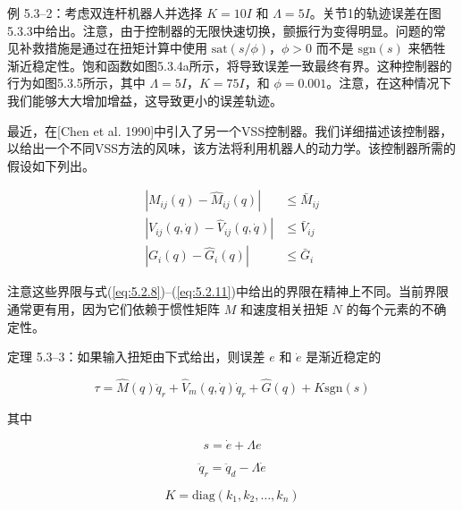 \documentclass[UTF8,12pt,a4paper]{ctexart}
\begin{document}
\begin{example}[VSS控制器 1]
例 5.3--2：考虑双连杆机器人并选择 $K = 10I$ 和 $\Lambda = 5I$。关节1的轨迹误差在图5.3.3中给出。注意，由于控制器的无限快速切换，颤振行为变得明显。问题的常见补救措施是通过在扭矩计算中使用 $\text{sat}(s/\phi)$，$\phi > 0$ 而不是 $\text{sgn}(s)$ 来牺牲渐近稳定性。饱和函数如图5.3.4a所示，将导致误差一致最终有界。这种控制器的行为如图5.3.5所示，其中 $\Lambda = 5I$，$K = 75I$，和 $\phi = 0.001$。注意，在这种情况下我们能够大大增加增益，这导致更小的误差轨迹。
\end{example}

最近，在[Chen et al. 1990]中引入了另一个VSS控制器。我们详细描述该控制器，以给出一个不同VSS方法的风味，该方法将利用机器人的动力学。该控制器所需的假设如下列出。

\begin{equation}\label{eq:5.3.7}
\begin{aligned}
|M_{ij}(q) - \hat{M}_{ij}(q)| &\leq \bar{M}_{ij} \\
|V_{ij}(q, \dot{q}) - \hat{V}_{ij}(q, \dot{q})| &\leq \bar{V}_{ij} \\
|G_i(q) - \hat{G}_i(q)| &\leq \bar{G}_i
\end{aligned}
\end{equation}

注意这些界限与式(\ref{eq:5.2.8})--(\ref{eq:5.2.11})中给出的界限在精神上不同。当前界限通常更有用，因为它们依赖于惯性矩阵 $M$ 和速度相关扭矩 $N$ 的每个元素的不确定性。

\begin{theorem}\label{thm:5.3.3}
定理 5.3--3：如果输入扭矩由下式给出，则误差 $e$ 和 $\dot{e}$ 是渐近稳定的

\begin{equation}
\tau = \hat{M}(q)\ddot{q}_r + \hat{V}_m(q, \dot{q})\dot{q}_r + \hat{G}(q) + K \text{sgn}(s)
\end{equation}

其中

\begin{equation}
s = \dot{e} + \Lambda e
\end{equation}

\begin{equation}
\ddot{q}_r = \ddot{q}_d - \Lambda \dot{e}
\end{equation}

\begin{equation}
K = \text{diag}(k_1, k_2, \ldots, k_n)
\end{equation}
\end{theorem}
\end{document}

